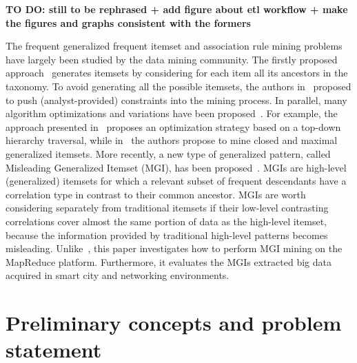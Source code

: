 \textbf{TO DO: still to be rephrased + add figure about etl workflow + make the figures and graphs consistent with the formers}

The frequent generalized frequent itemset and association rule mining problems~\cite{Srikant1995} have largely been studied by the data mining community.
The firstly proposed approach~\cite{Srikant1995} generates itemsets by considering for each item all its ancestors in the taxonomy. 
To avoid generating all the possible itemsets, the authors in~\cite{Sriphaew2002,BaralisCCG12} proposed to push (analyst-provided) constraints into the mining process.
In parallel, many algorithm optimizations and variations have been proposed~\cite{Han1999,KunkleZC08,ChangeTKDE}. 
For example, the approach presented in~\cite{Han1999} proposes an optimization strategy based on a top-down hierarchy traversal, while 
in~\cite{KunkleZC08} the authors propose to mine closed and maximal generalized itemsets. 
More recently, a new type of generalized pattern, called Misleading Generalized Itemset (MGI), has been proposed~\cite{MGI}. 
MGIs are high-level (generalized) itemsets for which a relevant subset of frequent descendants have a correlation type in contrast to their common ancestor. 
MGIs are worth considering separately from traditional itemsets if their low-level contrasting correlations cover almost the same portion of data as the high-level itemset, 
because the information provided by traditional high-level patterns becomes misleading. 
Unlike~\cite{MGI}, this paper investigates how to perform MGI mining on the MapReduce platform. 
Furthermore, it evaluates the MGIs extracted big data acquired in smart city and networking environments.


\section{Preliminary concepts and problem statement}
\label{probstat}


